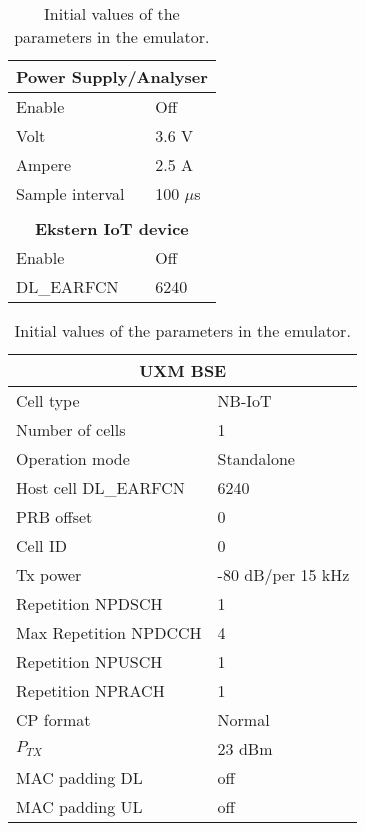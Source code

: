 \begin{table}[H]
\captionsetup{belowskip=0em}
\noindent
\centering
\begin{minipage}[t]{0.48\textwidth}
\begin{tabular}{|p{4cm}|p{2cm}|}
\hline
\multicolumn{2}{|c|}{\textbf{Power Supply/Analyser}}                         \\ \hline
Enable             & Off            \\ \hline
Volt               & 3.6 V          \\ \hline
Ampere             & 2.5 A          \\ \hline
Sample interval	   & 100 $\mu$s		\\ \hline
\multicolumn{2}{c}{}\\ \hline
\multicolumn{2}{|c|}{\textbf{Ekstern IoT device}}                            \\ \hline
Enable             & Off            \\ \hline
DL\_EARFCN         & 6240           \\ \hline
\end{tabular}
\end{minipage}%
\hfill
\begin{minipage}[t]{0.48\textwidth}
\begin{tabular}{|p{4cm}|p{2cm}|} \hline
\multicolumn{2}{|c|}{\textbf{UXM \gls{BSE}}} \\ \hline
Cell type			 & NB-IoT         \\ \hline
Number of cells		 & 1              \\ \hline
Operation mode		 & Standalone     \\ \hline
Host cell DL\_EARFCN & 6240           \\ \hline
PRB offset			 & 0	          \\ \hline
Cell ID				 & 0              \\ \hline
Tx power			 & -80 dB/per 15 kHz \\ \hline
Repetition NPDSCH	 & 1	          \\ \hline
Max Repetition NPDCCH & 4	          \\ \hline
Repetition NPUSCH	 & 1	          \\ \hline
Repetition NPRACH	 & 1	          \\ \hline
CP format			 & Normal         \\ \hline
$P_{TX}$				 & 23 dBm         \\ \hline
MAC padding DL		 & off       	  \\ \hline
MAC padding UL		 & off       	  \\ \hline
\end{tabular}
\end{minipage}
\caption{Initial values of the parameters in the emulator.}
\label{tab:setup_parameters}
\end{table}

